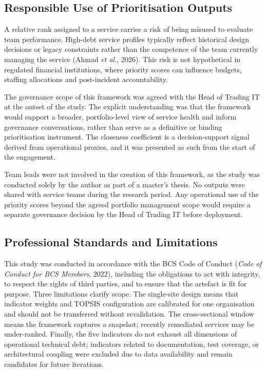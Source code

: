 \documentclass[
  12pt,
  letterpaper,
  12pt,
  oneside,
  english,
  onehalfspacing,
  headsepline]{MastersDoctoralThesis}
\begin{document}
\subsection{Responsible Use of Prioritisation
Outputs}\label{responsible-use-of-prioritisation-outputs}

A relative rank assigned to a service carries a risk of being misused to
evaluate team performance. High-debt service profiles typically reflect
historical design decisions or legacy constraints rather than the
competence of the team currently managing the service (Ahmad \emph{et
al.}, 2026). This risk is not hypothetical in regulated financial
institutions, where priority scores can influence budgets, staffing
allocations and post-incident accountability.

The governance scope of this framework was agreed with the Head of
Trading IT at the outset of the study. The explicit understanding was
that the framework would support a broader, portfolio-level view of
service health and inform governance conversations, rather than serve as
a definitive or binding prioritisation instrument. The closeness
coefficient is a decision-support signal derived from operational
proxies, and it was presented as such from the start of the engagement.

Team leads were not involved in the creation of this framework, as the
study was conducted solely by the author as part of a master's thesis.
No outputs were shared with service teams during the research period.
Any operational use of the priority scores beyond the agreed portfolio
management scope would require a separate governance decision by the
Head of Trading IT before deployment.

\subsection{Professional Standards and
Limitations}\label{professional-standards-and-limitations}

This study was conducted in accordance with the BCS Code of Conduct
(\emph{Code of {Conduct} for {BCS Members}}, 2022), including the
obligations to act with integrity, to respect the rights of third
parties, and to ensure that the artefact is fit for purpose. Three
limitations clarify scope. The single-site design means that indicator
weights and TOPSIS configuration are calibrated for one organisation and
should not be transferred without revalidation. The cross-sectional
window means the framework captures a snapshot; recently remediated
services may be under-ranked. Finally, the five indicators do not
exhaust all dimensions of operational technical debt; indicators related
to documentation, test coverage, or architectural coupling were excluded
due to data availability and remain candidates for future iterations.
\end{document}
